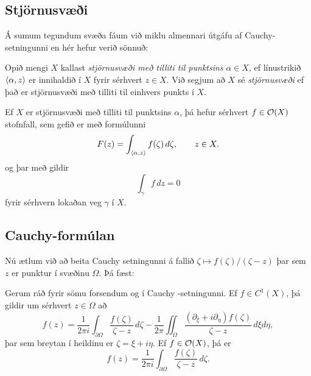 \subsection*{Stjörnusvæði}


Á sumum tegundum svæða fáum við miklu almennari útgáfu af
Cauchy-setningunni en hér hefur verið sönnuð: 

\begin{sk}
Opið mengi $X$ kallast {\it stjörnusvæði með tilliti til punktsins }
$\alpha\in X$, ef línustrikið ${\langle\alpha,z\rangle}$ er innihaldið í $X$
fyrir sérhvert $z\in X$.  Við segjum að $X$ sé {\it
stjörnusvæði} ef
það er stjörnusvæði með tilliti til einhvers punkts í $X$.
\end{sk}


\begin{se} \label{se:10.2.3}
Ef $X$ er stjörnusvæði með tilliti til punktsins $\alpha$, 
þá hefur sérhvert $f\in {\cal O}(X)$ stofnfall, sem
gefið er með formúlunni
\begin{equation*}\label{10.2.4a}
F(z)=\int_{{\langle\alpha,z\rangle}} f(\zeta)\, d\zeta, \qquad z\in X.
\end{equation*}
og
þar með gildir 
\begin{equation*}\int_\gamma f\, dz =0
\label{10.2.4}
 \end{equation*}
fyrir sérhvern lokaðan veg $\gamma$ í $X$.
\end{se}

\subsection*{Cauchy-formúlan}


Nú ætlum við að beita Cauchy setningunni á fallið 
$\zeta\mapsto f(\zeta)/(\zeta-z)$ þar sem $z$ er punktur í
svæðinu $\Omega$.  Þá fæst:

\begin{se}
Gerum ráð fyrir sömu forsendum og í Cauchy -setn\-ing\-unni.  Ef
$f\in C^1(X)$, þá gildir um sérhvert $z\in \Omega$ að
\begin{equation*}
f(z)=\dfrac 1{2 \pi i}\int_{\partial\Omega}\dfrac
{f(\zeta)}{\zeta-z}\, d\zeta -\dfrac 1{2\pi}\iint_{\Omega}
\dfrac{(\partial_\xi+i\partial_\eta)f(\zeta)}
{\zeta-z}\, d\xi d\eta, \label{10.2.5}
\end{equation*}
þar sem breytan í heildinu er ${\zeta}={\xi}+i\eta$.
Ef $f\in {\cal O}(X)$, þá er 
\begin{equation*}
f(z)=\dfrac 1{2 \pi i}\int_{\partial\Omega}\dfrac
{f(\zeta)}{\zeta-z}\, d\zeta.\label{10.2.6}
\end{equation*}
\end{se}


